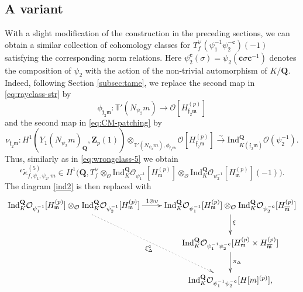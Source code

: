 \documentclass[10pt,letterpaper]{amsart}
\theoremstyle{plain}
\theoremstyle{definition}
\newtheorem{rmk}[thm]{Remark}
\theoremstyle{definition}
\theoremstyle{plain}
\theoremstyle{plain}
\theoremstyle{plain}
\theoremstyle{remark}
\numberwithin{equation}{section}
\newcommand{\cc}{\mathbf{c}}
\newcommand{\fkm}{\mathfrak{m}}
\newcommand{\fkmbar}{\overline{\mathfrak{m}}}
\newcommand{\fkf}{\mathfrak{f}}
\DeclareMathOperator{\et}{\acute{e}t}
\def\cO{\mathcal O}
\newcommand{\Q}{\mathbf{Q}}
\newcommand{\Z}{\mathbf{Z}}
\begin{document}


\subsection{A variant}\label{variant}
With a slight modification of the construction in the preceding  sections, we can obtain a similar collection of cohomology classes for $T_f^\vee(\psi_1^{-1}\psi_2^{-\cc})(-1)$  satisfying the corresponding norm relations. Here  $\psi_2^\cc(\sigma)=\psi_2(\cc\sigma\cc^{-1})$ denotes the composition of $\psi_2$ with the action of the non-trivial automorphism of $K/\Q$. Indeed, following Section \ref{subsec:tame}, we replace the second map in \eqref{eq:rayclass-str} 
by 
 \[
\phi_{\fkf_2\fkm}:\mathbb{T}'(N_{\psi_2}m)\rightarrow\cO[H_{\fkf_2\fkm}^{(p)}]
\]
and the second map in \eqref{eq:CM-patching} 
by
\[\nu_{\fkf_2\fkm}:H^1_{\et}(Y_1(N_{\psi_2}m)_{\overline{\Q}},\Z_p(1))\otimes_{\mathbb{T}'(N_{\psi_2}m),\phi_{\fkf_2\fkm}}\mathcal{O}[H_{\mathfrak{f}_2\fkm}^{(p)}]\xrightarrow{\sim}{\mathrm{Ind}}^{\Q}_{K(\fkf_2\fkm)}\mathcal{O}(\psi_{2}^{-1}).\]
Thus, similarly as in \eqref{eq:wrongclass-5} we obtain 
\[
{}^\cc\tilde{\kappa}_{f,\psi_1,\psi_2,m}^{(5)}\in H^1\bigl(\Q,T_f^{\vee}\otimes_{\mathcal{O}}{\mathrm{Ind}}^{\Q}_{K}\mathcal{O}_{\psi_1^{-1}}[H_{\fkm}^{(p)}]\otimes_{\mathcal{O}}{\mathrm{Ind}}^{\Q}_{K}\mathcal{O}_{\psi_2^{-1}}[H_{\fkm}^{(p)}](-1)\bigr).\]
The diagram \eqref{ind2} is then replaced with
\begin{equation}\label{ind2-c}
\begin{aligned}
     \xymatrix{
\text{Ind}^{\Q}_{K}\mathcal{O}_{\psi_{1}^{-1}}[H_{\fkm}^{(p)}]\otimes_{\mathcal{O}}\text{Ind}^{\Q}_{K}\mathcal{O}_{\psi_{2}^{-1}}[H_{\fkm}^{(p)}] \ar@{..>}[ddr]_{\xi_{\Delta}^{\cc}} \ar[r]^{1\otimes\upsilon} & \text{Ind}^{\Q}_{K}\mathcal{O}_{\psi_{1}^{-1}}[H_{\fkm}^{(p)}]\otimes_{\mathcal{O}}\text{Ind}^{\Q}_{K}\mathcal{O}_{\psi_{2}^{-\cc}}[H_{\fkmbar}^{(p)}] \ar[d]^(.45){\xi} \\
& \text{Ind}^{\Q}_{K}\mathcal{O}_{\psi_{1}^{-1}\psi_{2}^{-\cc}}[H_{\fkm}^{(p)}\times H_{\fkmbar}^{(p)}] \ar[d]^{\pi_\Delta} \\
& \text{Ind}^{\Q}_{K}\mathcal{O}_{\psi_{1}^{-1}\psi_{2}^{-\cc}}[H[m]^{(p)}], }
\end{aligned}
\end{equation}
\end{document}
